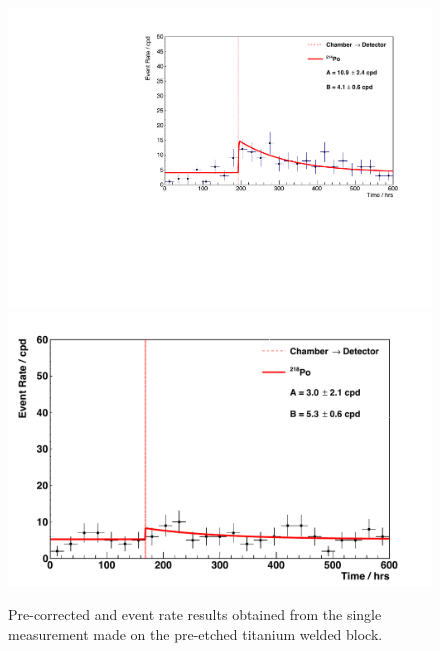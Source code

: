 \begin{figure}[b!]
    \centering
    \includegraphics[scale=0.42]{Chapter_4/Figures/ucl_measurements/titanium_sheets_pre_etching_1_Po214.pdf}
    \includegraphics[scale=0.42]{Chapter_4/Figures/ucl_measurements/titanium_sheets_pre_etching_1_Po218.pdf}
    \caption[Pre-corrected \PoTOF{} and \PoTOE{} event rate results obtained from the single measurement made on the pre-etched titanium sheets.]
    {Pre-corrected \PoTOF{} and \PoTOE{} event rate results obtained from the single measurement made on the pre-etched titanium welded block.}
    \label{fig:ti_pre_etched_sheets_results}
\end{figure}
%

